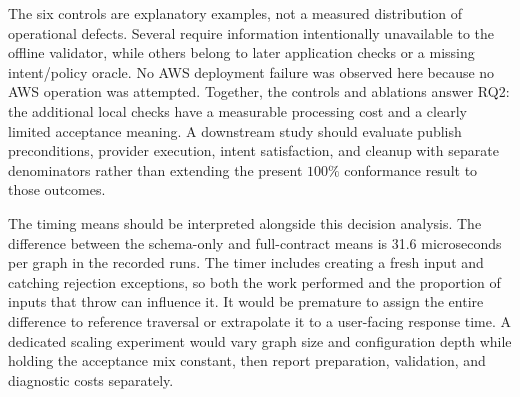 The six controls are explanatory examples, not a measured distribution of operational defects. Several require information intentionally unavailable to the offline validator, while others belong to later application checks or a missing intent/policy oracle. No AWS deployment failure was observed here because no AWS operation was attempted. Together, the controls and ablations answer RQ2: the additional local checks have a measurable processing cost and a clearly limited acceptance meaning. A downstream study should evaluate publish preconditions, provider execution, intent satisfaction, and cleanup with separate denominators rather than extending the present $100\%$ conformance result to those outcomes.


The timing means should be interpreted alongside this decision analysis. The difference between the schema-only and full-contract means is 31.6 microseconds per graph in the recorded runs. The timer includes creating a fresh input and catching rejection exceptions, so both the work performed and the proportion of inputs that throw can influence it. It would be premature to assign the entire difference to reference traversal or extrapolate it to a user-facing response time. A dedicated scaling experiment would vary graph size and configuration depth while holding the acceptance mix constant, then report preparation, validation, and diagnostic costs separately.
